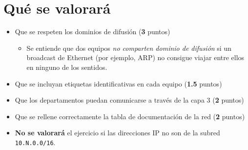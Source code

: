 \section{Qué se valorará}
\begin{itemize}
\item Que se respeten los dominios de difusión (\textbf{3} puntos)
  \begin{itemize}
  \item Se entiende que dos equipos \textit{no comparten dominio de difusión} si un broadcast de Ethernet (por ejemplo, ARP) no consigue viajar entre ellos en ninguno de los sentidos.
  \end{itemize}
\item Que se incluyan etiquetas identificativas en cada equipo (\textbf{1.5} puntos)  
\item Que los departamentos puedan comunicarse a través de la capa 3 (\textbf{2} puntos)
\item Que se rellene correctamente la tabla de documentación de la red (\textbf{2} puntos)
\item \textbf{No se valorará} el ejercicio si las direcciones IP no son de la subred \texttt{10.N.0.0/16}.
\end{itemize}




